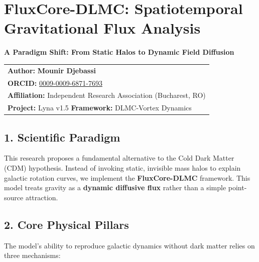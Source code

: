 \documentclass[
]{article}
\author{}
\date{}
\newcounter{none} %
\begin{document}
\section{FluxCore-DLMC: Spatiotemporal Gravitational Flux
Analysis}\label{fluxcore-dlmc-spatiotemporal-gravitational-flux-analysis}

\textbf{A Paradigm Shift: From Static Halos to Dynamic Field Diffusion}

{\def\LTcaptype{none} %
\begin{longtable}[]{@{}l@{}}
\toprule\noalign{}
\endhead
\bottomrule\noalign{}
\endlastfoot
\textbf{Author:} \textbf{Mounir Djebassi} \\
\textbf{ORCID:} \href{https://orcid.org}{0009-0009-6871-7693} \\
\textbf{Affiliation:} Independent Research Association (Bucharest,
RO) \\
\textbf{Project:} Lyna v1.5 \textbar{} \textbf{Framework:} DLMC-Vortex
Dynamics \\
\end{longtable}
}

\subsection{1. Scientific Paradigm}\label{scientific-paradigm}

This research proposes a fundamental alternative to the Cold Dark Matter
(CDM) hypothesis. Instead of invoking static, invisible mass halos to
explain galactic rotation curves, we implement the
\textbf{FluxCore-DLMC} framework. This model treats gravity as a
\textbf{dynamic diffusive flux} rather than a simple point-source
attraction.

\subsection{2. Core Physical Pillars}\label{core-physical-pillars}

The model's ability to reproduce galactic dynamics without dark matter
relies on three mechanisms:
\end{document}
